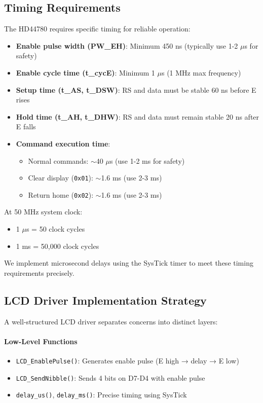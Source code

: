\subsection{Timing Requirements}

The HD44780 requires specific timing for reliable operation:

\begin{itemize}[nosep]
  \item \textbf{Enable pulse width (PW\_EH)}: Minimum 450 ns (typically use 1-2 $\mu$s for safety)
  \item \textbf{Enable cycle time (t\_cycE)}: Minimum 1 $\mu$s (1 MHz max frequency)
  \item \textbf{Setup time (t\_AS, t\_DSW)}: RS and data must be stable 60 ns before E rises
  \item \textbf{Hold time (t\_AH, t\_DHW)}: RS and data must remain stable 20 ns after E falls
  \item \textbf{Command execution time}:
    \begin{itemize}[nosep]
      \item Normal commands: $\sim$40 $\mu$s (use 1-2 ms for safety)
      \item Clear display (\texttt{0x01}): $\sim$1.6 ms (use 2-3 ms)
      \item Return home (\texttt{0x02}): $\sim$1.6 ms (use 2-3 ms)
    \end{itemize}
\end{itemize}

\noindent
At 50 MHz system clock:
\begin{itemize}[nosep]
  \item 1 $\mu$s = 50 clock cycles
  \item 1 ms = 50,000 clock cycles
\end{itemize}

\noindent
We implement microsecond delays using the SysTick timer to meet these timing requirements precisely.

\subsection{LCD Driver Implementation Strategy}

A well-structured LCD driver separates concerns into distinct layers:

\paragraph{Low-Level Functions}
\begin{itemize}[nosep]
  \item \texttt{LCD\_EnablePulse()}: Generates enable pulse (E high → delay → E low)
  \item \texttt{LCD\_SendNibble()}: Sends 4 bits on D7-D4 with enable pulse
  \item \texttt{delay\_us()}, \texttt{delay\_ms()}: Precise timing using SysTick
\end{itemize}

